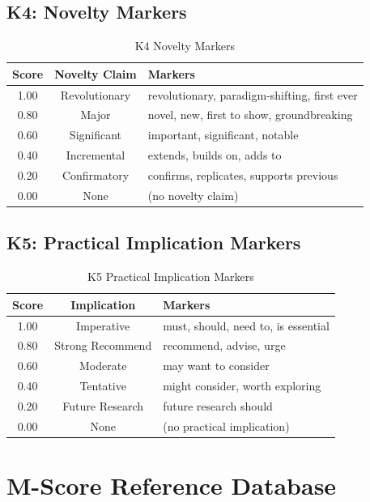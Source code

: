 \subsection{K4: Novelty Markers}

\begin{table}[H]
\centering
\small
\begin{tabular}{ccl}
\toprule
\textbf{Score} & \textbf{Novelty Claim} & \textbf{Markers} \\
\midrule
1.00 & Revolutionary & revolutionary, paradigm-shifting, first ever \\
0.80 & Major & novel, new, first to show, groundbreaking \\
0.60 & Significant & important, significant, notable \\
0.40 & Incremental & extends, builds on, adds to \\
0.20 & Confirmatory & confirms, replicates, supports previous \\
0.00 & None & (no novelty claim) \\
\bottomrule
\end{tabular}
\caption{K4 Novelty Markers}
\end{table}


\subsection{K5: Practical Implication Markers}

\begin{table}[H]
\centering
\small
\begin{tabular}{ccl}
\toprule
\textbf{Score} & \textbf{Implication} & \textbf{Markers} \\
\midrule
1.00 & Imperative & must, should, need to, is essential \\
0.80 & Strong Recommend & recommend, advise, urge \\
0.60 & Moderate & may want to consider \\
0.40 & Tentative & might consider, worth exploring \\
0.20 & Future Research & future research should \\
0.00 & None & (no practical implication) \\
\bottomrule
\end{tabular}
\caption{K5 Practical Implication Markers}
\end{table}


\section{M-Score Reference Database}
\label{app:mscores}

